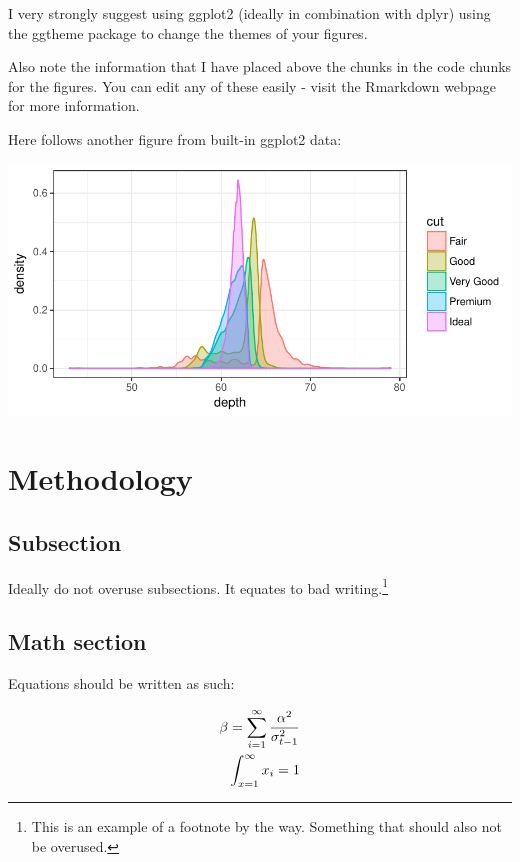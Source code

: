 \documentclass[12pt,a4paper]{article}
\numberwithin{equation}{section}
\numberwithin{figure}{section}
\numberwithin{table}{section}
\let\origfigure\figure
\let\endorigfigure\endfigure
\renewenvironment{figure}[1][2] {
    \expandafter\origfigure\expandafter[H]
} {
    \endorigfigure
}
\begin{document}
I very strongly suggest using ggplot2 (ideally in combination with
dplyr) using the ggtheme package to change the themes of your figures.

Also note the information that I have placed above the chunks in the
code chunks for the figures. You can edit any of these easily - visit
the Rmarkdown webpage for more information.

Here follows another figure from built-in ggplot2 data:

\begin{figure}[H]

{\centering \includegraphics{Template_files/figure-latex/figure2-1} 

}

\caption{Diamond Cut Plot \label{lit}}\label{fig:figure2}
\end{figure}

\section{Methodology}\label{methodology}

\subsection{Subsection}\label{subsection}

Ideally do not overuse subsections. It equates to bad writing.\footnote{This
  is an example of a footnote by the way. Something that should also not
  be overused.}

\subsection{Math section}\label{math-section}

Equations should be written as such:

\begin{align} 
\beta = \sum_{i = 1}^{\infty}\frac{\alpha^2}{\sigma_{t-1}^2} \label{eq1} \\ 
\int_{x = 1}^{\infty}x_{i} = 1 \notag
\end{align}
\end{document}
